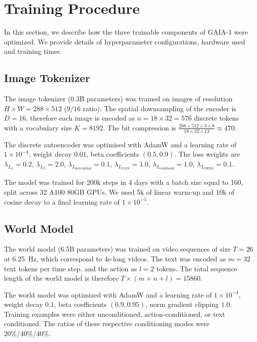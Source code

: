 \section{Training Procedure}
\label{section:training-procedure}

    
In this section, we describe how the three trainable components of GAIA-1 were optimized. We provide details of hyperparameter configurations, hardware used and training times.

\subsection{Image Tokenizer} 
The image tokenizer (0.3B parameters) was trained on images of resolution $H\times W = 288 \times 512$ ($9/16$ ratio). The spatial downsampling of the encoder is $D=16$, therefore each image is encoded as $n=18\times 32 = 576$ discrete tokens with a vocabulary size $K=8192$. The bit compression is $\frac{288\times512\times3\times8}{18\times32\times 13} \approx 470$. 

The discrete autoencoder was optimised with AdamW \citep{loshchilov19} and a learning rate of $1\times 10^{-4}$, weight decay $0.01$, beta coefficients $(0.5, 0.9)$. The loss weights are $\lambda_{L_1}=0.2$, $\lambda_{L_2}=2.0$, $\lambda_{L_{\text{perceptual}}}=0.1$, $\lambda_{L_{\text{GAN}}}=1.0$, $\lambda_{L_{\text{codebook}}}=1.0$, $\lambda_{L_{\text{DINO}}}=0.1$.

The model was trained for 200k steps in 4 days with a batch size equal to 160, split across 32 A100 80GB GPUs. We used 5k of linear warm-up and 10k of cosine decay to a final learning rate of $1\times 10^{-5}$.

\subsection{World Model}
The world model (6.5B parameters) was trained on video sequences of size $T = 26$ at \SI{6.25}{\hertz}, which correspond to 4s-long videos. The text was encoded as $m=32$ text tokens per time step, and the action as $l=2$ tokens. The total sequence length of the world model is therefore $T \times (m + n + l) = 15860$. 

The world model was optimized with AdamW and a learning rate of $1\times 10^{-4}$, weight decay $0.1$, beta coefficients $(0.9, 0.95)$, norm gradient clipping $1.0$. Training examples were either unconditioned, action-conditioned, or text conditioned. The ratios of these respective conditioning modes were 20\%/40\%/40\%.

